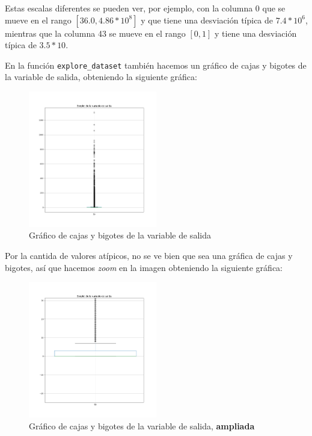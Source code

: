 \documentclass[11pt]{article}
\begin{document}
Estas escalas diferentes se pueden ver, por ejemplo, con la columna 0 que se mueve en el rango $[36.0, 4.86 * 10^8]$ y que tiene una desviación típica de $7.4 * 10^6$, mientras que la columna 43 se mueve en el rango $[0, 1]$ y tiene una desviación típica de $3.5 * 10$.

En la función \lstinline{explore_dataset} también hacemos un gráfico de cajas y bigotes de la variable de salida, obteniendo la siguiente gráfica:

\begin{figure}[H]
  \centering
  \includegraphics[width=0.5\textwidth]{boxplot_salida}
  \caption{Gráfico de cajas y bigotes de la variable de salida}
\end{figure}

Por la cantida de valores atípicos, no se ve bien que sea una gráfica de cajas y bigotes, así que hacemos \emph{zoom} en la imagen obteniendo la siguiente gráfica:

\begin{figure}[H]
  \centering
  \includegraphics[width=0.5\textwidth]{boxplot_salida_zoom}
  \caption{Gráfico de cajas y bigotes de la variable de salida, \textbf{ampliada}}
\end{figure}
\end{document}
